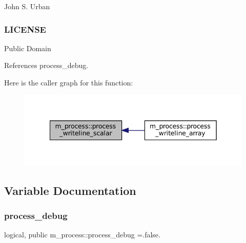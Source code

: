 John S. Urban \subsubsection*{L\+I\+C\+E\+N\+SE}

Public Domain 

References process\+\_\+debug.

Here is the caller graph for this function\+:
\nopagebreak
\begin{figure}[H]
\begin{center}
\leavevmode
\includegraphics[width=342pt]{namespacem__process_a72527c0ec0af26dcb14b8bfad6dcd482_icgraph}
\end{center}
\end{figure}


\subsection{Variable Documentation}
\mbox{\label{namespacem__process_a0fabee8d01338d5523fbdea5c5f1e894}} 
\subsubsection{\texorpdfstring{process\+\_\+debug}{process\_debug}}
{\footnotesize\ttfamily logical, public m\+\_\+process\+::process\+\_\+debug =.false.}


